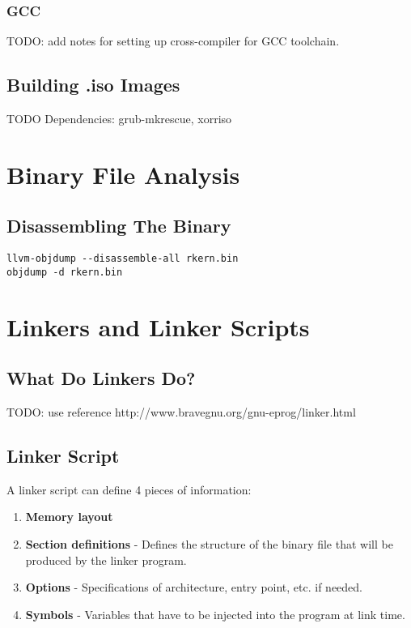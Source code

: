 \documentclass[a4paper,12pt,twoside]{report}
\begin{document}
			\subsection{GCC}
	        TODO: add notes for setting up cross-compiler for GCC toolchain.

	    \section{Building .iso Images}
	    TODO
	    Dependencies: grub-mkrescue, xorriso

    \chapter{Binary File Analysis}

        \section{Disassembling The Binary}

            \begin{verbatim}
llvm-objdump --disassemble-all rkern.bin
objdump -d rkern.bin
            \end{verbatim}

    \chapter{Linkers and Linker Scripts}

        \section{What Do Linkers Do?}
            TODO: use reference http://www.bravegnu.org/gnu-eprog/linker.html
        
        \section{Linker Script}
            A linker script can define 4 pieces of information:
            \begin{enumerate}
            	\item \textbf{Memory layout}
            	\item \textbf{Section definitions} - Defines the structure of the binary file that will be produced by the linker program.
            	\item \textbf{Options} - Specifications of architecture, entry point, etc. if needed.
            	\item \textbf{Symbols} - Variables that have to be injected into the program at link time.
            \end{enumerate}\cite{memfaultLinkerScripts}
        
\end{document}
